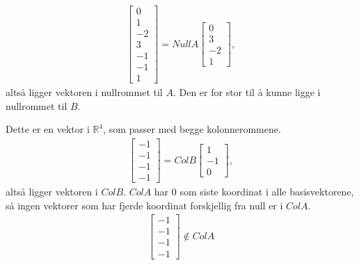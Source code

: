 \documentclass[11pt, a4paper, norsk]{NTNUoving}
\begin{document}
\begin{oppgave}
    \begin{punkt}
    \begin{align*}
        \begin{bmatrix} 0 \\ 1 \\ -2 \\ 3 \\ -1 \\ -1 \\ 1 \end{bmatrix} = NullA\begin{bmatrix} 0 \\ 3 \\ -2 \\1\end{bmatrix},
    \end{align*}
    altså ligger vektoren i nullrommet til $A$. Den er for stor til å kunne ligge i nullrommet til $B$. 
    \end{punkt}
    \begin{punkt}
        Dette er en vektor i $\mathbb{R}^4$, som passer med begge kolonnerommene. 
            \begin{align*}
        \begin{bmatrix} -1\\ -1 \\ -1 \\-1 \end{bmatrix} = ColB\begin{bmatrix} 1 \\ -1 \\ 0\end{bmatrix},
    \end{align*}
    altså ligger vektoren i $ColB$. $ColA$ har 0 som siste koordinat i alle basisvektorene, så ingen vektorer som har fjerde koordinat forskjellig fra null er i $ColA$.
    \begin{align*}
        \begin{bmatrix} -1\\ -1 \\ -1 \\-1 \end{bmatrix} \not\in ColA
    \end{align*}
    \end{punkt}
\end{oppgave}
\end{document}

